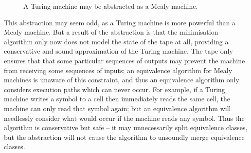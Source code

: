 \begin{figure}
  \begin{center}
  \end{center}
  
  \caption{A Turing machine may be abstracted as a Mealy machine.}
  \label{fig:mealy}
\end{figure}

This abstraction may seem odd, as a Turing machine is
more powerful than a Mealy machine. But a result of the abstraction
is that the minimisation algorithm only now does not model the state
of the tape at all, providing a conservative and sound approximation of
the Turing machine. The tape only ensures that that some particular
sequences of outputs may prevent the machine from receiving
some sequences of inputs; an equivalence algorithm for Mealy
machines is unaware of this constraint, and thus an equivalence
algorithm only considers execution paths which can never occur. For
example, if a Turing machine writes a symbol to a cell then immediately
reads the same cell, the machine can only read that symbol again; but an
equivalence algorithm will needlessly consider what would occur if the
machine reads any symbol. Thus the algorithm is conservative but safe --
it may unnecessarily split equivalence classes, but the abstraction will
not cause the algorithm to unsoundly merge equivalence classes.

